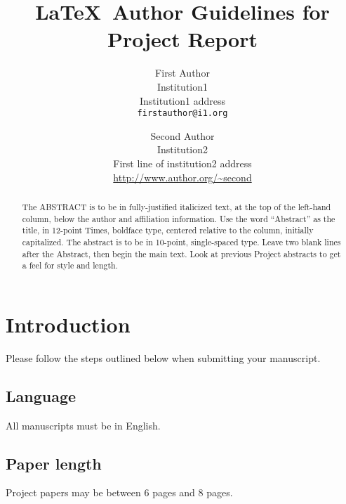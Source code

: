 \documentclass[10pt,twocolumn,letterpaper]{article}
\begin{document}
\title{\LaTeX\ Author Guidelines for Project Report}

\author{First Author\\
Institution1\\
Institution1 address\\
{\tt\small firstauthor@i1.org}
\and
Second Author\\
Institution2\\
First line of institution2 address\\
{\small\url{http://www.author.org/~second}}
}

\maketitle

\begin{abstract}
   The ABSTRACT is to be in fully-justified italicized text, at the top of the left-hand column, below the author and affiliation information. Use the word ``Abstract'' as the title, in 12-point Times, boldface type, centered relative to the column, initially capitalized. The abstract is to be in 10-point, single-spaced type. Leave two blank lines after the Abstract, then begin the main text. Look at previous Project abstracts to get a feel for style and length.
\end{abstract}

\section{Introduction}

Please follow the steps outlined below when submitting your manuscript.

\subsection{Language}

All manuscripts must be in English.

\subsection{Paper length}
Project papers may be between 6 pages and 8 pages.  
\end{document}
